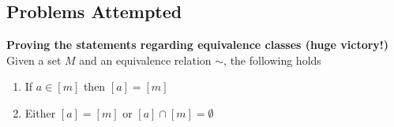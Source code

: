 \subsection*{Problems Attempted}
\textbf{Proving the statements regarding equivalence classes (huge victory!)}
Given a set \(M\) and an equivalence relation \(\sim\), the following holds  
\begin{enumerate}[label=\roman*)]
    \item If \(a \in [m]\) then \([a] = [m]\)
    \item Either \([a] = [m]\) or \([a] \cap [m] = \emptyset\)    
\end{enumerate}
